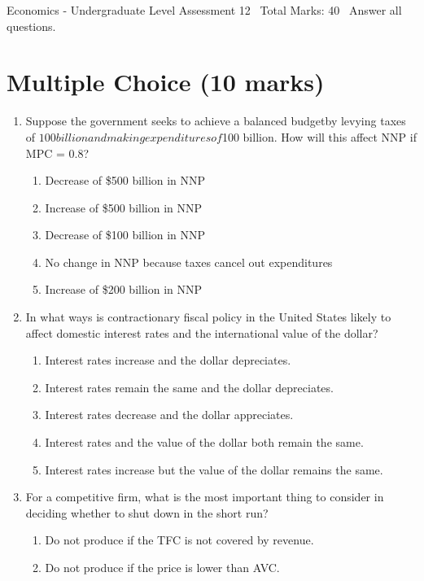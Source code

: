 \documentclass[12pt]{article}
\begin{document}
\begin{center}
Economics - Undergraduate Level Assessment 12 \
Total Marks: 40 \
Answer all questions.
\end{center}

\section*{Multiple Choice (10 marks)}
\begin{enumerate}[label=\arabic*.]
\item Suppose the government seeks to achieve a balanced budgetby levying taxes of $100 billion and making expendituresof $100 billion. How will this affect NNP if MPC = 0.8?
\begin{enumerate}[label=(\alph*)]
    \item Decrease of \$500 billion in NNP
    \item Increase of \$500 billion in NNP
    \item Decrease of \$100 billion in NNP
    \item No change in NNP because taxes cancel out expenditures
    \item Increase of \$200 billion in NNP
\end{enumerate}
\item In what ways is contractionary fiscal policy in the United States likely to affect domestic interest rates and the international value of the dollar?
\begin{enumerate}[label=(\alph*)]
    \item Interest rates increase and the dollar depreciates.
    \item Interest rates remain the same and the dollar depreciates.
    \item Interest rates decrease and the dollar appreciates.
    \item Interest rates and the value of the dollar both remain the same.
    \item Interest rates increase but the value of the dollar remains the same.
\end{enumerate}
\item For a competitive firm, what is the most important thing to consider in deciding whether to shut down in the short run?
\begin{enumerate}[label=(\alph*)]
    \item Do not produce if the TFC is not covered by revenue.
    \item Do not produce if the price is lower than AVC.

\end{enumerate}
\end{enumerate}
\end{document}
